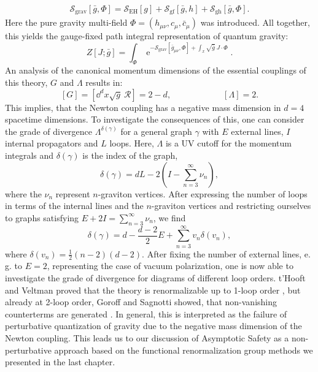 \begin{align}
	\mathcal{S}_{\text{grav}}[\bar{g},\Phi] = \mathcal{S}_{\text{EH}}[g] + \mathcal{S}_{\text{gf}}[\bar{g}, h] + \mathcal{S}_{\text{gh}}[\bar{g},\Phi] .
\end{align}
 Here the pure gravity multi-field $\Phi=(h_{\mu\nu}, c_{\mu}, \bar{c}_{\mu})$ was introduced. All together, this yields the gauge-fixed path integral representation of quantum gravity:
 \begin{equation}
Z[J ; \bar{g}]=\int_{\Phi} \operatorname{e}^{-\mathcal{S}_{\text{grav}}\left[\bar{g}_{\mu\nu}, \Phi\right]+\int_x \sqrt{\bar{g}} \ J \cdot \Phi}.
\end{equation}
An analysis of the canonical momentum dimensions of the essential couplings of this theory, $G$ and $\Lambda$ results in:
\begin{equation}
\left[G\right] = \left[\dd^dx \sqrt{g}\ \mathcal{R}\right] = 2-d,  \qquad\qquad\qquad \left[\Lambda\right] = 2.
\end{equation}
This implies, that the Newton coupling has a negative mass dimension in $d=4$ spacetime dimensions. To investigate the consequences of this, one can consider the grade of divergence $\Lambda^{\delta(\gamma)}$ for a general graph $\gamma$ with $E$ external lines, $I$ internal propagators and $L$ loops. Here, $\Lambda$ is a UV cutoff for the momentum integrals and $\delta(\gamma)$ is the index of the graph,
\begin{equation}
	\delta(\gamma) = dL- 2\left(I-\sum_{n=3}^{\infty}\nu_n\right),
\end{equation}
where the $\nu_n$ represent $n$-graviton vertices. After expressing the number of loops in terms of the internal lines and the $n$-graviton vertices and restricting ourselves to graphs satisfying $E + 2I = \sum_{n=3}^{\infty}\nu_n$, we find
\begin{equation}
	\delta(\gamma)=d-\frac{d-2}{2} E+\sum\limits_{n=3}^{\infty} v_{n} \delta\left(v_{n}\right),
\end{equation}
where $\delta\left(v_{n}\right)=\frac{1}{2}(n-2)(d-2)$.
After fixing the number of external lines, e.\,g. to $E=2$, representing the case of vacuum polarization, one is now able to investigate the grade of divergence for diagrams of different loop orders. t'Hooft and Veltman proved that the theory is renormalizable up to 1-loop order \cite{tHooftVeltmann1974}, but already at 2-loop order, Goroff and Sagnotti showed, that non-vanishing counterterms are generated \cite{GoroffSanotti1985}. In general, this is interpreted as the failure of perturbative quantization of gravity due to the negative mass dimension of the Newton coupling. This leads us to our discussion of Asymptotic Safety as a non-perturbative approach based on the functional renormalization group methods we presented in the last chapter.  
  